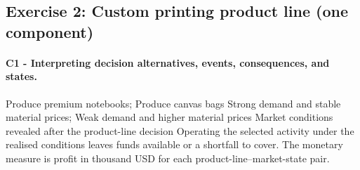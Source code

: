 	\newpage
	\subsection{Exercise 2: Custom printing product line (one component)}
	\label{sec:problem2-custom-printing-c1-c3}
	\paragraph*{C1 - Interpreting decision alternatives, events, consequences, and states.}
	\DecisionElementsTable
{Produce premium notebooks; Produce canvas bags}
{Strong demand and stable material prices; Weak demand and higher material prices}
{Market conditions revealed after the product-line decision}
{Operating the selected activity under the realised conditions leaves funds available or a shortfall to cover. The monetary measure is profit in thousand USD for each product-line--market-state pair.}



